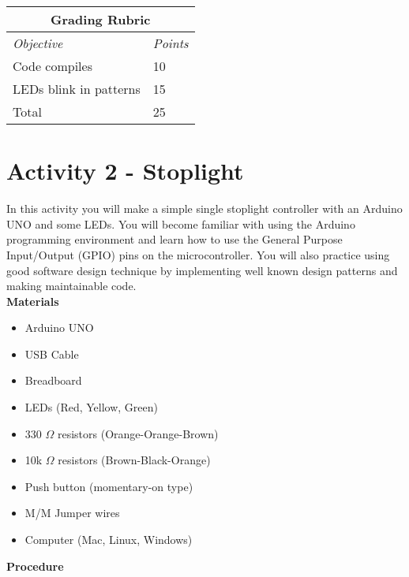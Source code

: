 \documentclass[10pt]{article}
\begin{document}
\begin{table}[h!]
	\footnotesize
	\centering
	\begin{tabular}{@{}ll@{}}
		\multicolumn{2}{c}{\textbf{Grading Rubric}} \\ \midrule 
		\multicolumn{1}{l}{\textit{Objective}}   & \textit{Points}   \\ \midrule 
		Code compiles                    & 10       \\ \midrule
		LEDs blink in patterns            & 15       \\ \midrule
		Total                            & 25       \\ \bottomrule
	\end{tabular}
\end{table}

\section*{Activity 2 -  Stoplight}

In this activity you will make a simple single stoplight controller with an
Arduino UNO and some LEDs. You will become familiar with using the Arduino
programming environment and learn how to use the General Purpose Input/Output
(GPIO) pins on the microcontroller. You will also practice using good software
design technique by implementing well known design patterns and making
maintainable code. \\ 

\noindent\textbf{Materials}
\begin{multicols}{2}
	{\small \begin{itemize}
			\item Arduino UNO
			\item USB Cable
			\item Breadboard
			\item LEDs (Red, Yellow, Green)
			\item 330 $ \Omega $ resistors (Orange-Orange-Brown)
			\item 10k $ \Omega $ resistors (Brown-Black-Orange)
			\item Push button (momentary-on type)
			\item M/M Jumper wires
			\item Computer (Mac, Linux, Windows)
	\end{itemize}}  
\end{multicols}


\noindent\textbf{Procedure}
\end{document}
